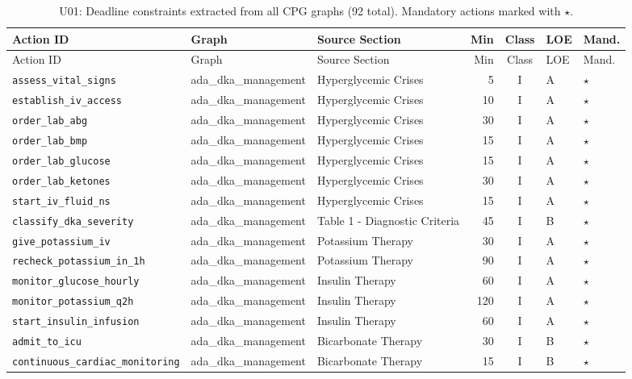 \begin{longtable}{lllrcll}
\caption{U01: Deadline constraints extracted from all CPG graphs (92 total).
Mandatory actions marked with $\star$.}
\label{tab:appendix_deadlines} \\
\toprule
Action ID & Graph & Source Section & Min & Class & LOE & Mand. \\
\midrule
\endfirsthead
\toprule
Action ID & Graph & Source Section & Min & Class & LOE & Mand. \\
\midrule
\endhead
\bottomrule
\endfoot
\texttt{assess\_vital\_signs} & ada\_dka\_management & Hyperglycemic Crises & 5 & I & A & $\star$ \\
\texttt{establish\_iv\_access} & ada\_dka\_management & Hyperglycemic Crises & 10 & I & A & $\star$ \\
\texttt{order\_lab\_abg} & ada\_dka\_management & Hyperglycemic Crises & 30 & I & A & $\star$ \\
\texttt{order\_lab\_bmp} & ada\_dka\_management & Hyperglycemic Crises & 15 & I & A & $\star$ \\
\texttt{order\_lab\_glucose} & ada\_dka\_management & Hyperglycemic Crises & 15 & I & A & $\star$ \\
\texttt{order\_lab\_ketones} & ada\_dka\_management & Hyperglycemic Crises & 30 & I & A & $\star$ \\
\texttt{start\_iv\_fluid\_ns} & ada\_dka\_management & Hyperglycemic Crises & 15 & I & A & $\star$ \\
\texttt{classify\_dka\_severity} & ada\_dka\_management & Table 1 - Diagnostic Criteria & 45 & I & B & $\star$ \\
\texttt{give\_potassium\_iv} & ada\_dka\_management & Potassium Therapy & 30 & I & A & $\star$ \\
\texttt{recheck\_potassium\_in\_1h} & ada\_dka\_management & Potassium Therapy & 90 & I & A & $\star$ \\
\texttt{monitor\_glucose\_hourly} & ada\_dka\_management & Insulin Therapy & 60 & I & A & $\star$ \\
\texttt{monitor\_potassium\_q2h} & ada\_dka\_management & Insulin Therapy & 120 & I & A & $\star$ \\
\texttt{start\_insulin\_infusion} & ada\_dka\_management & Insulin Therapy & 60 & I & A & $\star$ \\
\texttt{admit\_to\_icu} & ada\_dka\_management & Bicarbonate Therapy & 30 & I & B & $\star$ \\
\texttt{continuous\_cardiac\_monitoring} & ada\_dka\_management & Bicarbonate Therapy & 15 & I & B & $\star$ \\

\end{longtable}
